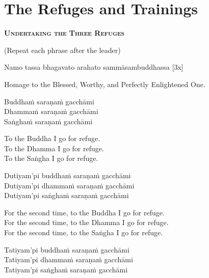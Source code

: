 
\section{The Refuges and Trainings}

\begin{center}
  \textbf{\textsc{Undertaking the Three Refuges}}\makeatletter\hyperlink{endnote138-appendix}\makeatother
\end{center}

\begin{center}
  (Repeat each phrase after the leader)
\end{center}

Namo tassa bhagavato arahato sammāsambuddhassa \hfill{[3x]}

\begin{english}
  Homage to the Blessed, Worthy, and Perfectly Enlightened One.
\end{english}

Buddhaṁ saraṇaṁ gacchāmi\\
Dhammaṁ saraṇaṁ gacchāmi\\
Saṅghaṁ saraṇaṁ gacchāmi

\begin{english-verses}
  To the Buddha I go for refuge.\\
  To the Dhamma I go for refuge.\\
  To the Saṅgha I go for refuge.
\end{english-verses}

Dutiyam'pi buddhaṁ saraṇaṁ gacchāmi\\
Dutiyam'pi dhammaṁ saraṇaṁ gacchāmi\\
Dutiyam'pi saṅghaṁ saraṇaṁ gacchāmi

\begin{english-verses}
  For the second time, to the Buddha I go for refuge.\\
  For the second time, to the Dhamma I go for refuge.\\
  For the second time, to the Saṅgha I go for refuge.
\end{english-verses}

Tatiyam'pi buddhaṁ saraṇaṁ gacchāmi\\
Tatiyam'pi dhammaṁ saraṇaṁ gacchāmi\\
Tatiyam'pi saṅghaṁ saraṇaṁ gacchāmi

